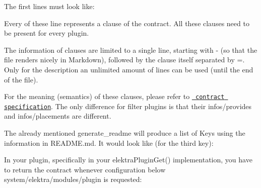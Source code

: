 The first lines must look like\+:


\begin{DoxyCode}{0}
\end{DoxyCode}


Every of these line represents a clause of the contract. All these clauses need to be present for every plugin.

The information of clauses are limited to a single line, starting with {\ttfamily -\/} (so that the file renders nicely in Markdown), followed by the clause itself separated by {\ttfamily =}. Only for the description an unlimited amount of lines can be used (until the end of the file).

For the meaning (semantics) of these clauses, please refer to \href{/home/mpranj/workspace/libelektra/doc/CONTRACT.ini}{\texttt{ contract specification}}. The only difference for filter plugins is that their {\ttfamily infos/provides} and {\ttfamily infos/placements} are different.

The already mentioned {\ttfamily generate\+\_\+readme} will produce a list of Keys using the information in {\ttfamily R\+E\+A\+D\+M\+E.\+md}. It would look like (for the third key)\+:


\begin{DoxyCode}{0}
\end{DoxyCode}


In your plugin, specifically in your {\ttfamily elektra\+Plugin\+Get()} implementation, you have to return the contract whenever configuration below {\ttfamily system/elektra/modules/plugin} is requested\+:


